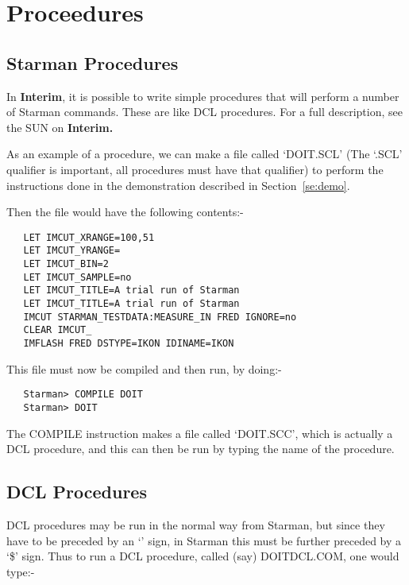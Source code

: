 \section{Proceedures}
\label{se:proc}

\subsection{Starman Procedures}
\label{se:proc_star}

In {\bf Interim}, it is possible to write simple procedures that will perform a
number of Starman commands. These are like {\small DCL} procedures. For a
full description, see the SUN on {\bf Interim.}

As an example of a procedure, we can make a file called `DOIT.SCL' (The
`.SCL' qualifier is important, all procedures must have that qualifier) to
perform the instructions done in the demonstration described in
Section~\ref{se:demo}. 

Then the file would have the following contents:-

\begin{verbatim}
   LET IMCUT_XRANGE=100,51
   LET IMCUT_YRANGE=
   LET IMCUT_BIN=2
   LET IMCUT_SAMPLE=no
   LET IMCUT_TITLE=A trial run of Starman
   LET IMCUT_TITLE=A trial run of Starman
   IMCUT STARMAN_TESTDATA:MEASURE_IN FRED IGNORE=no
   CLEAR IMCUT_
   IMFLASH FRED DSTYPE=IKON IDINAME=IKON
\end{verbatim}

This file must now be compiled and then run, by doing:-

\begin{verbatim}
   Starman> COMPILE DOIT
   Starman> DOIT
\end{verbatim}

The COMPILE instruction makes a file called `DOIT.SCC', which is actually
a {\small DCL} procedure, and this can then be run by typing the name of
the procedure.

\subsection{DCL Procedures}

{\small DCL} procedures may be run in the normal way from Starman, but
since they have to be preceded by an `\@' sign, in Starman this must
be further preceded by a `\$' sign. Thus to run a DCL procedure, called
(say) DOIT{\undersc}DCL.COM, one would type:-

